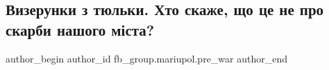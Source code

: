  
 
 
 
 

\subsection{Визерунки з тюльки. Хто скаже, що це не про скарби нашого міста?}
\label{sec:31_01_2023.fb.fb_group.mariupol.pre_war.2.vizerunki_z_tyulki__}

\ifcmt
 author_begin
   author_id fb_group.mariupol.pre_war
 author_end
\fi
